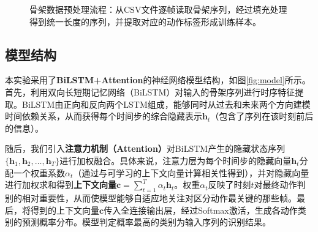 \documentclass[UTF8]{article}
\begin{document}
\begin{figure}[htbp]
    \centering
    \caption{骨架数据预处理流程：从CSV文件逐帧读取骨架序列，经过填充处理得到统一长度的序列，并提取对应的动作标签形成训练样本。}
    \label{fig:process}
\end{figure}

\subsection{模型结构}

本实验采用了\textbf{BiLSTM+Attention}的神经网络模型结构，如图\ref{fig:model}所示。首先，利用双向长短期记忆网络（BiLSTM）对输入的骨架序列进行时序特征提取。BiLSTM由正向和反向两个LSTM组成，能够同时从过去和未来两个方向建模时间依赖关系，从而获得每个时间步的综合隐藏表示$\mathbf{h}_t$（包含了序列在该时刻前后的信息）。

随后，我们引入\textbf{注意力机制（Attention）}对BiLSTM产生的隐藏状态序列$\{\mathbf{h}_1, \mathbf{h}_2, \dots, \mathbf{h}_T\}$进行加权融合。具体来说，注意力层为每个时间步的隐藏向量$\mathbf{h}_t$分配一个权重系数$\alpha_t$（通过与可学习的上下文向量计算相关性得到），并对隐藏向量进行加权求和得到\textbf{上下文向量}$\mathbf{c}=\sum_{t=1}^{T} \alpha_t \mathbf{h}_t$。权重$\alpha_t$反映了时刻$t$对最终动作判别的相对重要性，从而使模型能够自适应地关注对区分动作最关键的那些帧。最后，将得到的上下文向量$\mathbf{c}$传入全连接输出层，经过Softmax激活，生成各动作类别的预测概率分布。模型判定概率最高的类别为输入序列的识别结果。
\end{document}
